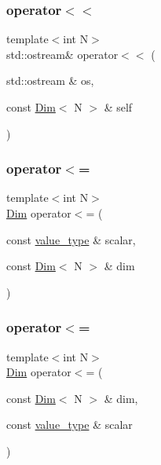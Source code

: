 \mbox{\label{structbc_1_1Dim_afaa96bc6b1e916ec02928e3dcae05ad6}} 
\subsubsection{\texorpdfstring{operator$<$$<$}{operator<<}}
{\footnotesize\ttfamily template$<$int N$>$ \\
std\+::ostream\& operator$<$$<$ (\begin{DoxyParamCaption}\item[{std\+::ostream \&}]{os,  }\item[{const \hyperlink{structbc_1_1Dim}{Dim}$<$ N $>$ \&}]{self }\end{DoxyParamCaption})\hspace{0.3cm}{\ttfamily [friend]}}

\mbox{\label{structbc_1_1Dim_a618b61edf2f4a1214b92c258e402db2f}} 
\subsubsection{\texorpdfstring{operator$<$=}{operator<=}\hspace{0.1cm}{\footnotesize\ttfamily [1/2]}}
{\footnotesize\ttfamily template$<$int N$>$ \\
\hyperlink{structbc_1_1Dim}{Dim} operator$<$= (\begin{DoxyParamCaption}\item[{const \hyperlink{structbc_1_1Dim_af59ff554825273cf6bd9619b2c78c196}{value\+\_\+type} \&}]{scalar,  }\item[{const \hyperlink{structbc_1_1Dim}{Dim}$<$ N $>$ \&}]{dim }\end{DoxyParamCaption})\hspace{0.3cm}{\ttfamily [friend]}}

\mbox{\label{structbc_1_1Dim_a71114f0154057b13a18a54ab937c4468}} 
\subsubsection{\texorpdfstring{operator$<$=}{operator<=}\hspace{0.1cm}{\footnotesize\ttfamily [2/2]}}
{\footnotesize\ttfamily template$<$int N$>$ \\
\hyperlink{structbc_1_1Dim}{Dim} operator$<$= (\begin{DoxyParamCaption}\item[{const \hyperlink{structbc_1_1Dim}{Dim}$<$ N $>$ \&}]{dim,  }\item[{const \hyperlink{structbc_1_1Dim_af59ff554825273cf6bd9619b2c78c196}{value\+\_\+type} \&}]{scalar }\end{DoxyParamCaption})\hspace{0.3cm}{\ttfamily [friend]}}

